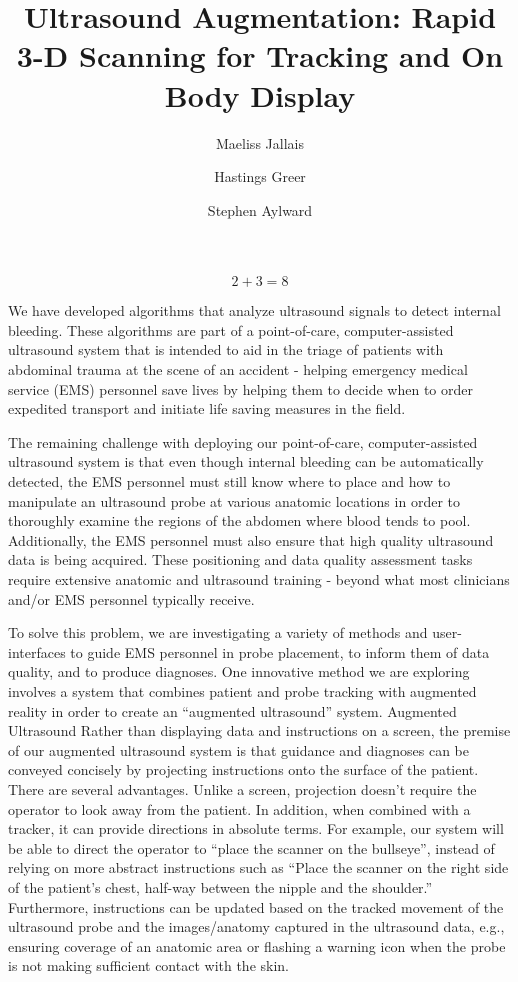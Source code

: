\documentclass{llncs}
\begin{document}
%
\frontmatter
%
\pagestyle{headings}
\title{Ultrasound Augmentation: Rapid 3-D Scanning for Tracking and On Body Display}
\author{Maeliss Jallais \and Hastings Greer \and Stephen Aylward}
%
\mainmatter
\maketitle
$$2 + 3 = 8$$


We have developed algorithms that analyze ultrasound signals to detect internal bleeding.  These algorithms are part of a point-of-care, computer-assisted ultrasound system that is intended to aid in the triage of patients with abdominal trauma at the scene of an accident - helping emergency medical service (EMS) personnel save lives by helping them to decide when to order expedited transport and initiate life saving measures in the field.

The remaining challenge with deploying our point-of-care, computer-assisted ultrasound system is that even though internal bleeding can be automatically detected, the EMS personnel must still know where to place and how to manipulate an ultrasound probe at various anatomic locations in order to thoroughly examine the regions of the abdomen where blood tends to pool.  Additionally, the EMS personnel must also ensure that high quality ultrasound data is being acquired. These positioning and data quality assessment tasks require extensive anatomic and ultrasound training - beyond what most clinicians and/or EMS personnel typically receive.

To solve this problem, we are investigating a variety of methods and user-interfaces to guide EMS personnel in probe placement, to inform them of data quality, and to produce diagnoses.   One innovative method we are exploring involves a system that combines patient and probe tracking with augmented reality in order to create  an “augmented ultrasound” system.
Augmented Ultrasound
Rather than displaying data and instructions on a screen, the premise of our augmented ultrasound system is that guidance and diagnoses can be conveyed concisely by projecting instructions onto the surface of the patient. There are several advantages. Unlike a screen, projection doesn’t require the operator to look away from the patient. In addition, when combined with a tracker, it can provide directions in absolute terms. For example, our system will be able to direct the operator to “place the scanner on the bullseye”, instead of relying on more abstract instructions such as “Place the scanner on the right side of the patient’s chest, half-way between the nipple and the shoulder.” Furthermore, instructions can be updated based on the tracked movement of the ultrasound probe and the images/anatomy captured in the ultrasound data, e.g., ensuring coverage of an anatomic area or flashing a warning icon when the probe is not making sufficient contact with the skin. 
\end{document}
